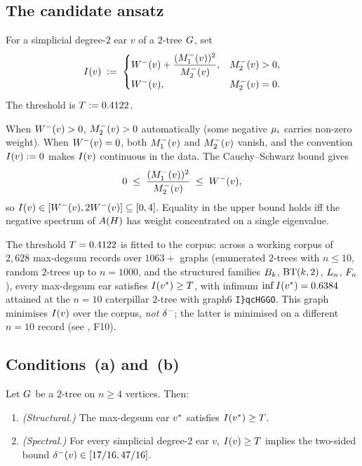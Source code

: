 \subsection{The candidate ansatz}\label{sec:moment-form:candidate}

\begin{definition}\label{def:joint-invariant}
For a simplicial degree-$2$ ear $v$ of a $2$-tree $G$, set
\[
I(v) \;:=\;
\begin{cases}
W^{-}(v) + \dfrac{(M_{1}^{-}(v))^{2}}{M_{2}^{-}(v)}, & M_{2}^{-}(v) > 0, \\[1ex]
W^{-}(v), & M_{2}^{-}(v) = 0.
\end{cases}
\]
The threshold is $T := 0.4122$.
\end{definition}

When $W^{-}(v) > 0$, $M_{2}^{-}(v) > 0$ automatically (some negative $\mu_{i}$
carries non-zero weight). When $W^{-}(v) = 0$, both $M_{1}^{-}(v)$ and
$M_{2}^{-}(v)$ vanish, and the convention $I(v) := 0$ makes $I(v)$ continuous
in the data. The Cauchy--Schwarz bound  gives
\[
0 \;\le\; \frac{(M_{1}^{-}(v))^{2}}{M_{2}^{-}(v)} \;\le\; W^{-}(v),
\]
so $I(v) \in [W^{-}(v), 2W^{-}(v)] \subseteq [0, 4]$. Equality in the upper
bound holds iff the negative spectrum of $A(H)$ has weight
concentrated on a single eigenvalue.

The threshold $T = 0.4122$ is fitted to the corpus: across a
working corpus of $2{,}628$ max-degsum records over $1063+$ graphs
(enumerated $2$-trees with $n \le 10$, random $2$-trees up to
$n = 1000$, and the structured families $B_{k}$, $\mathrm{BT}(k,2)$, $L_{n}$,
$F_{n}$), every max-degsum ear satisfies $I(v^{*}) \ge T$, with
infimum $\inf I(v^{*}) = 0.6384$ attained at the $n = 10$ caterpillar
$2$-tree with graph6 \texttt{I\}qcHG\textasciigrave GO}. This graph
minimises $I(v)$ over the corpus, \emph{not} $\delta^{-}$; the latter is
minimised on a different $n = 10$ record (see
, F10).

\subsection{Conditions~(a) and~(b)}\label{sec:moment-form:conditions}

\begin{conjecture}\label{cnj:joint-invariant}
Let $G$ be a $2$-tree on $n \ge 4$ vertices. Then:
\begin{enumerate}[label=(\alph*)]
\item \emph{(Structural.)}\label{cond:a} The max-degsum ear $v^{*}$
satisfies $I(v^{*}) \ge T$.
\item \emph{(Spectral.)}\label{cond:b} For every simplicial degree-$2$
ear $v$, $I(v) \ge T$ implies the two-sided bound
$\delta^{-}(v) \in [17/16, 47/16]$.
\end{enumerate}
\end{conjecture}

